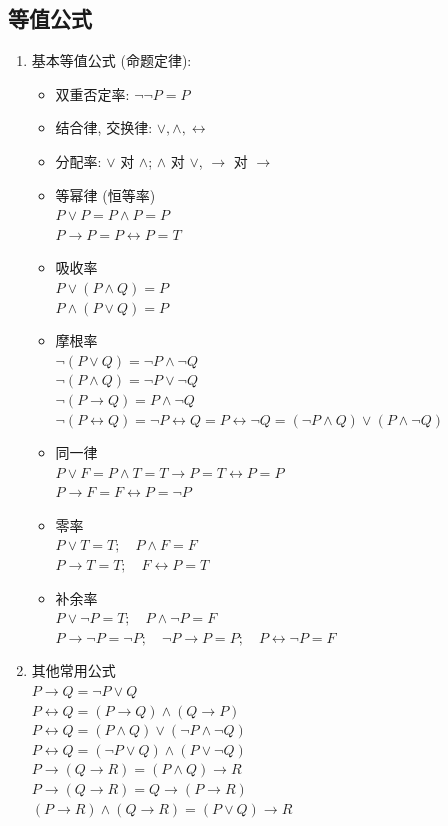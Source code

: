 \documentclass[11pt,a4paper,twocolumn,fleqn]{article} %
\begin{document}
\subsection{等值公式} %
\label{sub:logic_equ}
\begin{enumerate}
	\item 基本等值公式 (命题定律):
	\begin{itemize}
		\item 双重否定率: $\lnot\lnot P = P$
		\item 结合律, 交换律: $\lor, \land, \leftrightarrow$
		\item 分配率: $\lor$ 对 $\land$; $\land$ 对 $\lor$, $\to$ 对 $\to$
		\item 等幂律 (恒等率)\\
		$P\lor P = P\land P = P$ \\
		$P\to P = P\leftrightarrow P = T$
		\item 吸收率\\
		$P\lor (P\land Q) = P$ \\
		$P\land (P\lor Q) = P$
		\item 摩根率\\
		$\lnot(P\lor Q) = \lnot P\land \lnot Q$ \\
		$\lnot(P\land Q) = \lnot P\lor \lnot Q$ \\
		$\lnot(P\to Q) = P\land \lnot Q$ \\
		$\lnot(P\leftrightarrow Q) = \lnot P\leftrightarrow Q 
		= P\leftrightarrow\lnot Q = (\lnot P\land Q)\lor(P\land\lnot Q)$
		\item 同一律\\
		$P\lor F = P\land T = T\to P = T\leftrightarrow P = P$ \\
		$P\to F = F\leftrightarrow P = \lnot P$
		\item 零率\\
		$P\lor T = T;\quad P\land F = F$ \\
		$P\to T = T;\quad F\leftrightarrow P = T$
		\item 补余率\\
		$P\lor\lnot P = T;\quad P\land\lnot P = F$ \\
		$P\to\lnot P = \lnot P;\quad \lnot P\to P = P;\quad 
		P\leftrightarrow \lnot P = F$
	\end{itemize}
	\item 其他常用公式\\
	$P \to Q = \lnot P \lor Q$\\
	$P\leftrightarrow Q = (P\to Q)\land (Q\to P)$ \\
	$P\leftrightarrow Q = (P\land Q)\lor (\lnot P\land \lnot Q)$ \\
	$P\leftrightarrow Q = (\lnot P\lor Q)\land (P\lor \lnot Q)$ \\
	$P\to(Q\to R) = (P\land Q)\to R$ \\
	$P\to(Q\to R) = Q\to(P\to R)$ \\
	$(P\to R)\land (Q\to R) = (P\lor Q)\to R$
\end{enumerate}
\end{document}
